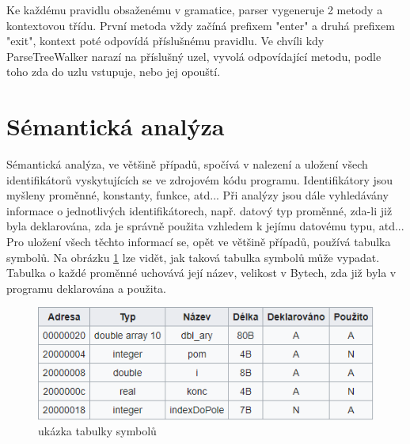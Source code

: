 Ke každému pravidlu obsaženému v gramatice, parser vygeneruje 2 metody a kontextovou třídu. První metoda vždy začíná prefixem "enter" a druhá prefixem "exit", kontext poté odpovídá příslušnému pravidlu. Ve chvíli kdy ParseTreeWalker narazí na příslušný uzel, vyvolá odpovídající metodu, podle toho zda do uzlu vstupuje, nebo jej opouští.


\section{Sémantická analýza} \label{44SemantickaAnalyza}

Sémantická analýza, ve většině případů, spočívá v nalezení a uložení všech identifikátorů vyskytujících se ve zdrojovém kódu programu. Identifikátory jsou myšleny proměnné, konstanty, funkce, atd... Při analýzy jsou dále vyhledávány informace o jednotlivých identifikátorech, např. datový typ proměnné, zda-li již byla deklarována, zda je správně použita vzhledem k jejímu datovému typu, atd... Pro uložení všech těchto informací se, opět ve většině případů, používá tabulka symbolů. Na obrázku \ref{img:tabulka_symbolu} lze vidět, jak taková tabulka symbolů může vypadat. Tabulka o každé proměnné uchovává její název, velikost v Bytech, zda již byla v programu deklarována a použita.\\

\begin{figure}[b!]
	\centering
	\includegraphics[scale=0.8]{images/symbol_table}
	\caption{ukázka tabulky symbolů \cite{tabulka_symbolu}} 			    
	\label{img:tabulka_symbolu}
\end{figure}

